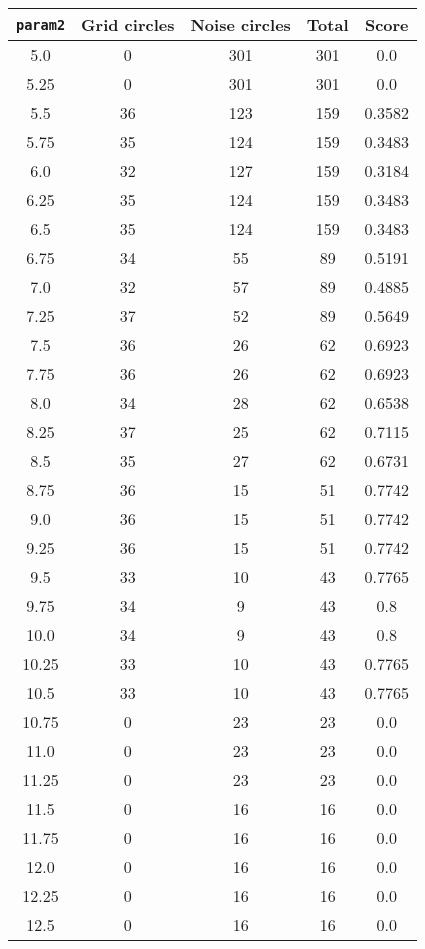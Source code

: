 \documentclass[letterpaper, 12pt]{article}
\begin{document}
\begin{longtable}{|c|c|c|c|c|}
\hline
\textbf{\texttt{param2}} & \textbf{Grid circles} & \textbf{Noise circles} & \textbf{Total} & \textbf{Score} \\
\hline
5.0 & 0 & 301 & 301 & 0.0 \\
\hline
5.25 & 0 & 301 & 301 & 0.0 \\
\hline
5.5 & 36 & 123 & 159 & 0.3582 \\
\hline
5.75 & 35 & 124 & 159 & 0.3483 \\
\hline
6.0 & 32 & 127 & 159 & 0.3184 \\
\hline
6.25 & 35 & 124 & 159 & 0.3483 \\
\hline
6.5 & 35 & 124 & 159 & 0.3483 \\
\hline
6.75 & 34 & 55 & 89 & 0.5191 \\
\hline
7.0 & 32 & 57 & 89 & 0.4885 \\
\hline
7.25 & 37 & 52 & 89 & 0.5649 \\
\hline
7.5 & 36 & 26 & 62 & 0.6923 \\
\hline
7.75 & 36 & 26 & 62 & 0.6923 \\
\hline
8.0 & 34 & 28 & 62 & 0.6538 \\
\hline
8.25 & 37 & 25 & 62 & 0.7115 \\
\hline
8.5 & 35 & 27 & 62 & 0.6731 \\
\hline
8.75 & 36 & 15 & 51 & 0.7742 \\
\hline
9.0 & 36 & 15 & 51 & 0.7742 \\
\hline
9.25 & 36 & 15 & 51 & 0.7742 \\
\hline
9.5 & 33 & 10 & 43 & 0.7765 \\
\hline
9.75 & 34 & 9 & 43 & 0.8 \\
\hline
10.0 & 34 & 9 & 43 & 0.8 \\
\hline
10.25 & 33 & 10 & 43 & 0.7765 \\
\hline
10.5 & 33 & 10 & 43 & 0.7765 \\
\hline
10.75 & 0 & 23 & 23 & 0.0 \\
\hline
11.0 & 0 & 23 & 23 & 0.0 \\
\hline
11.25 & 0 & 23 & 23 & 0.0 \\
\hline
11.5 & 0 & 16 & 16 & 0.0 \\
\hline
11.75 & 0 & 16 & 16 & 0.0 \\
\hline
12.0 & 0 & 16 & 16 & 0.0 \\
\hline
12.25 & 0 & 16 & 16 & 0.0 \\
\hline
12.5 & 0 & 16 & 16 & 0.0 \\

\end{longtable}
\end{document}
